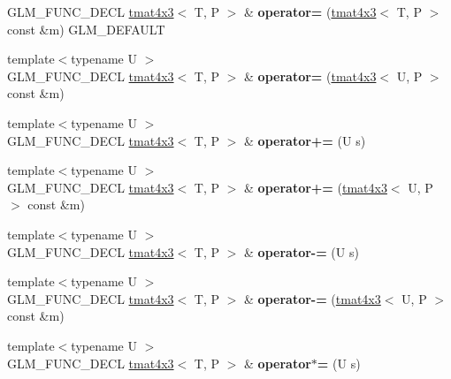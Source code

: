 \begin{DoxyCompactItemize}
G\+L\+M\+\_\+\+F\+U\+N\+C\+\_\+\+D\+E\+CL \hyperlink{structglm_1_1tmat4x3}{tmat4x3}$<$ T, P $>$ \& {\bfseries operator=} (\hyperlink{structglm_1_1tmat4x3}{tmat4x3}$<$ T, P $>$ const \&m) G\+L\+M\+\_\+\+D\+E\+F\+A\+U\+LT
\item 
\mbox{\label{structglm_1_1tmat4x3_a1a8400e31fd17c23aff288242b7a78ca}} 
{\footnotesize template$<$typename U $>$ }\\G\+L\+M\+\_\+\+F\+U\+N\+C\+\_\+\+D\+E\+CL \hyperlink{structglm_1_1tmat4x3}{tmat4x3}$<$ T, P $>$ \& {\bfseries operator=} (\hyperlink{structglm_1_1tmat4x3}{tmat4x3}$<$ U, P $>$ const \&m)
\item 
\mbox{\label{structglm_1_1tmat4x3_a24679f2dacf9cc1f8f708f40bb1f3aab}} 
{\footnotesize template$<$typename U $>$ }\\G\+L\+M\+\_\+\+F\+U\+N\+C\+\_\+\+D\+E\+CL \hyperlink{structglm_1_1tmat4x3}{tmat4x3}$<$ T, P $>$ \& {\bfseries operator+=} (U s)
\item 
\mbox{\label{structglm_1_1tmat4x3_a74f871665b46c2f00ef0bd0267816e4b}} 
{\footnotesize template$<$typename U $>$ }\\G\+L\+M\+\_\+\+F\+U\+N\+C\+\_\+\+D\+E\+CL \hyperlink{structglm_1_1tmat4x3}{tmat4x3}$<$ T, P $>$ \& {\bfseries operator+=} (\hyperlink{structglm_1_1tmat4x3}{tmat4x3}$<$ U, P $>$ const \&m)
\item 
\mbox{\label{structglm_1_1tmat4x3_a124dd7f16916a27ab14d698c0760f6f2}} 
{\footnotesize template$<$typename U $>$ }\\G\+L\+M\+\_\+\+F\+U\+N\+C\+\_\+\+D\+E\+CL \hyperlink{structglm_1_1tmat4x3}{tmat4x3}$<$ T, P $>$ \& {\bfseries operator-\/=} (U s)
\item 
\mbox{\label{structglm_1_1tmat4x3_a7c8ddab1781bfac021f6ccb388f4320c}} 
{\footnotesize template$<$typename U $>$ }\\G\+L\+M\+\_\+\+F\+U\+N\+C\+\_\+\+D\+E\+CL \hyperlink{structglm_1_1tmat4x3}{tmat4x3}$<$ T, P $>$ \& {\bfseries operator-\/=} (\hyperlink{structglm_1_1tmat4x3}{tmat4x3}$<$ U, P $>$ const \&m)
\item 
\mbox{\label{structglm_1_1tmat4x3_a49f3e365fca15f32e4607d209648bb49}} 
{\footnotesize template$<$typename U $>$ }\\G\+L\+M\+\_\+\+F\+U\+N\+C\+\_\+\+D\+E\+CL \hyperlink{structglm_1_1tmat4x3}{tmat4x3}$<$ T, P $>$ \& {\bfseries operator$\ast$=} (U s)

\end{DoxyCompactItemize}
